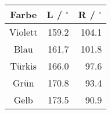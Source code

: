 \begin{tabular}{c|rr}
Farbe & L / ${}^\circ$ & R / ${}^\circ$ \\
\hline
Violett & 159.2 & 104.1\\
Blau & 161.7 & 101.8\\
Türkis & 166.0 & 97.6\\
Grün & 170.8 & 93.4\\
Gelb & 173.5 & 90.9
\end{tabular}